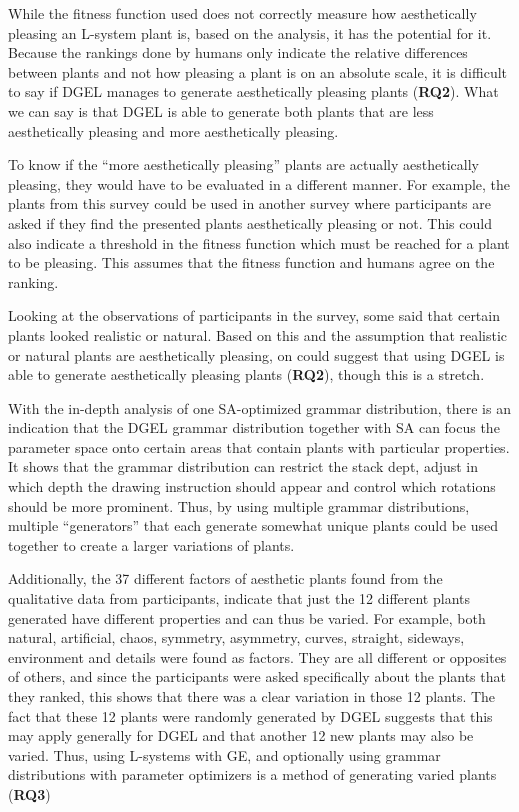 While the fitness function used does not correctly measure how aesthetically pleasing an \gls{L-system} plant is, based on the analysis, it has the potential for it.
Because the rankings done by humans only indicate the relative differences between plants and not how pleasing a plant is on an absolute scale, it is difficult to say if \gls{DGEL} manages to generate aesthetically pleasing plants (\textbf{RQ2}).
What we can say is that \gls{DGEL} is able to generate both plants that are less aesthetically pleasing and more aesthetically pleasing.

To know if the ``more aesthetically pleasing'' plants are actually aesthetically pleasing, they would have to be evaluated in a different manner.
For example, the plants from this survey could be used in another survey where participants are asked if they find the presented plants aesthetically pleasing or not.
This could also indicate a threshold in the fitness function which must be reached for a plant to be pleasing.
This assumes that the fitness function and humans agree on the ranking.

Looking at the observations of participants in the survey, some said that certain plants looked realistic or natural.
Based on this and the assumption that realistic or natural plants are aesthetically pleasing, on could suggest that using \gls{DGEL} is able to generate aesthetically pleasing plants (\textbf{RQ2}), though this is a stretch.

With the in-depth analysis of one \gls{SA}-optimized grammar distribution, there is an indication that the \gls{DGEL} grammar distribution together with \gls{SA} can focus the parameter space onto certain areas that contain plants with particular properties.
It shows that the grammar distribution can restrict the stack dept, adjust in which depth the drawing instruction should appear and control which rotations should be more prominent.
Thus, by using multiple grammar distributions, multiple ``generators'' that each generate somewhat unique plants could be used together to create a larger variations of plants.

Additionally, the 37 different factors of aesthetic plants found from the qualitative data from participants, indicate that just the 12 different plants generated have different properties and can thus be varied.
For example, both natural, artificial, chaos, symmetry, asymmetry, curves, straight, sideways, environment and details were found as factors.
They are all different or opposites of others, and since the participants were asked specifically about the plants that they ranked, this shows that there was a clear variation in those 12 plants.
The fact that these 12 plants were randomly generated by \gls{DGEL} suggests that this may apply generally for \gls{DGEL} and that another 12 new plants may also be varied.
Thus, using \glspl{L-system} with \gls{GE}, and optionally using grammar distributions with parameter optimizers is a method of generating varied plants (\textbf{RQ3})

